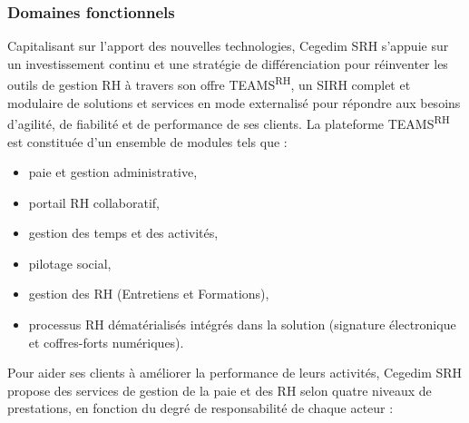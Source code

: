 \subsubsection{Domaines fonctionnels}
Capitalisant sur l'apport des nouvelles technologies, Cegedim SRH s'appuie sur un investissement continu et une stratégie de différenciation pour réinventer les outils de gestion RH à travers son offre TEAMS\textsuperscript{RH}, un SIRH complet et modulaire de solutions et services en mode externalisé pour répondre aux besoins d'agilité, de fiabilité et de performance de ses clients.
La plateforme TEAMS\textsuperscript{RH} est constituée d'un ensemble de modules tels que :

\begin{itemize}
    \item paie et gestion administrative,
    \item portail RH collaboratif,
    \item gestion des temps et des activités,
    \item pilotage social,
    \item gestion des RH (Entretiens et Formations),
    \item processus RH dématérialisés intégrés dans la solution (signature électronique et coffres-forts numériques).
\end{itemize}
\newpage
Pour aider ses clients à améliorer la performance de leurs activités, Cegedim SRH propose des services de gestion de la paie et des RH selon quatre niveaux de prestations, en fonction du degré de responsabilité de chaque acteur :\\ 

